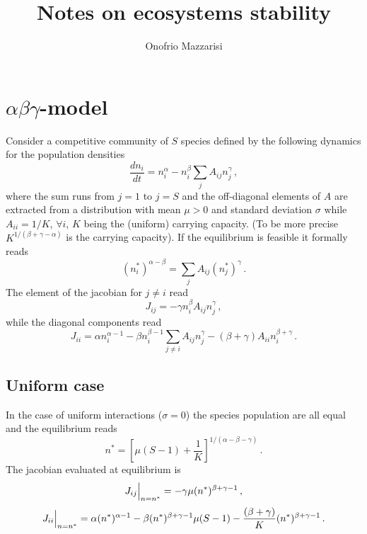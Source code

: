 \documentclass[10pt]{article}
\title{{\bf Notes on ecosystems stability}}
\author{Onofrio Mazzarisi}
\begin{document}


\maketitle

\section{$\alpha\beta\gamma$-model}

Consider a competitive community of $S$ species
defined by the following dynamics for the population densities
\begin{equation}
    \frac{dn_i}{dt}=n_i^{\alpha}-n_i^{\beta}\sum_{j}A_{ij}n_j^{\gamma} \, ,
\end{equation}
where the sum runs from $j=1$ to $j=S$ and the off-diagonal elements
of $A$ are extracted from a distribution
with mean $\mu>0$ and standard deviation $\sigma$ while $A_{ii}=1/K$, $\forall i$,
$K$ being the (uniform) carrying capacity.
(To be more precise $K^{1/(\beta+\gamma-\alpha)}$ is the carrying capacity).
If the equilibrium is feasible it formally reads
\begin{equation}
    (n_i^*)^{\alpha-\beta} = \sum_{j}A_{ij}(n_j^*)^{\gamma} \, .
\end{equation}
The element of the jacobian for $j\neq i$ read
\begin{equation}
    J_{ij} = -\gamma n_i^{\beta}A_{ij}n_j^{\gamma} \, ,
\end{equation}
while the diagonal components read
\begin{equation}
    J_{ii} = \alpha n_i^{\alpha-1}-\beta n_i^{\beta-1}\sum_{j\neq i}A_{ij}n_j^{\gamma}
    - (\beta+\gamma)A_{ii}n_i^{\beta+\gamma} \, .
\end{equation}

\subsection{Uniform case}
In the case of uniform interactions ($\sigma=0$)
the species population are all equal and the equilibrium reads
\begin{equation}
    n^*=\left[\mu(S-1)+\frac{1}{K}\right]^{1/(\alpha-\beta-\gamma)} \, .
\end{equation}
The jacobian evaluated at equilibrium is
\begin{equation}
    J_{ij}\Big{|}_{n=n^*} = -\gamma \mu (n^*)^{\beta+\gamma-1} \, ,
\end{equation}
\begin{equation}
    J_{ii}\Big{|}_{n=n^*} = \alpha (n^*)^{\alpha-1}-\beta (n^*)^{\beta+\gamma-1}\mu(S-1)
                            -\frac{(\beta+\gamma)}{K}(n^*)^{\beta+\gamma-1}\, .
\end{equation}
\end{document}
